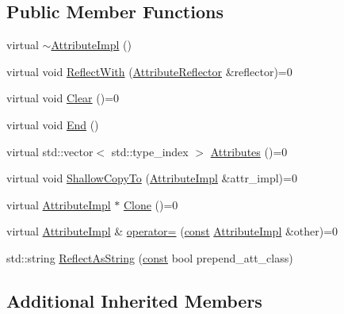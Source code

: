 \subsection*{Public Member Functions}
\begin{DoxyCompactItemize}
\item 
virtual \mbox{\hyperlink{classlucene_1_1core_1_1util_1_1AttributeImpl_aeaca9fe2fd952878945f12a519311ec4}{$\sim$\+Attribute\+Impl}} ()
\item 
virtual void \mbox{\hyperlink{classlucene_1_1core_1_1util_1_1AttributeImpl_a84d34275fb1ed67ac36fad7ff6388096}{Reflect\+With}} (\mbox{\hyperlink{namespacelucene_1_1core_1_1util_a7dbb701adaed055f73fb95eec83da10a}{Attribute\+Reflector}} \&reflector)=0
\item 
virtual void \mbox{\hyperlink{classlucene_1_1core_1_1util_1_1AttributeImpl_a04897a00a902f7a345dd44bbc4b482a8}{Clear}} ()=0
\item 
virtual void \mbox{\hyperlink{classlucene_1_1core_1_1util_1_1AttributeImpl_a9a662ddc9b72bc9711883a25b8379ea9}{End}} ()
\item 
virtual std\+::vector$<$ std\+::type\+\_\+index $>$ \mbox{\hyperlink{classlucene_1_1core_1_1util_1_1AttributeImpl_ac0631e6a7a11044883bc97447716d7cc}{Attributes}} ()=0
\item 
virtual void \mbox{\hyperlink{classlucene_1_1core_1_1util_1_1AttributeImpl_a010e8937832f53139c8fe42757476895}{Shallow\+Copy\+To}} (\mbox{\hyperlink{classlucene_1_1core_1_1util_1_1AttributeImpl}{Attribute\+Impl}} \&attr\+\_\+impl)=0
\item 
virtual \mbox{\hyperlink{classlucene_1_1core_1_1util_1_1AttributeImpl}{Attribute\+Impl}} $\ast$ \mbox{\hyperlink{classlucene_1_1core_1_1util_1_1AttributeImpl_a135318ad4c7c17b3d85e625e32fb42cd}{Clone}} ()=0
\item 
virtual \mbox{\hyperlink{classlucene_1_1core_1_1util_1_1AttributeImpl}{Attribute\+Impl}} \& \mbox{\hyperlink{classlucene_1_1core_1_1util_1_1AttributeImpl_ab032e399d03ce2f58c76881cf2b92325}{operator=}} (\mbox{\hyperlink{ZlibCrc32_8h_a2c212835823e3c54a8ab6d95c652660e}{const}} \mbox{\hyperlink{classlucene_1_1core_1_1util_1_1AttributeImpl}{Attribute\+Impl}} \&other)=0
\item 
std\+::string \mbox{\hyperlink{classlucene_1_1core_1_1util_1_1AttributeImpl_af3ad346d3dc7bbafa7957bcb48a9453e}{Reflect\+As\+String}} (\mbox{\hyperlink{ZlibCrc32_8h_a2c212835823e3c54a8ab6d95c652660e}{const}} bool prepend\+\_\+att\+\_\+class)
\end{DoxyCompactItemize}
\subsection*{Additional Inherited Members}


